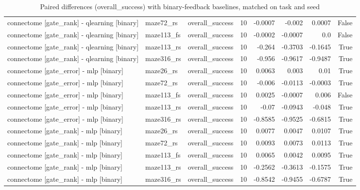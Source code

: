 \begin{table}[t]
\begin{tabular}{lllrrrrr}
connectome [gate\_rank] - qlearning [binary] & maze72\_rs & overall\_success & 10 & -0.0007 & -0.002 & 0.0007 & False \\
connectome [gate\_rank] - qlearning [binary] & maze113\_fs & overall\_success & 10 & -0.0002 & -0.0007 & 0.0 & False \\
connectome [gate\_rank] - qlearning [binary] & maze113\_rs & overall\_success & 10 & -0.264 & -0.3703 & -0.1645 & True \\
connectome [gate\_rank] - qlearning [binary] & maze316\_rs & overall\_success & 10 & -0.956 & -0.9617 & -0.9487 & True \\
connectome [gate\_error] - mlp [binary] & maze26\_rs & overall\_success & 10 & 0.0063 & 0.003 & 0.01 & True \\
connectome [gate\_error] - mlp [binary] & maze72\_rs & overall\_success & 10 & -0.006 & -0.0113 & -0.0003 & True \\
connectome [gate\_error] - mlp [binary] & maze113\_fs & overall\_success & 10 & 0.0025 & -0.0007 & 0.006 & False \\
connectome [gate\_error] - mlp [binary] & maze113\_rs & overall\_success & 10 & -0.07 & -0.0943 & -0.048 & True \\
connectome [gate\_error] - mlp [binary] & maze316\_rs & overall\_success & 10 & -0.8585 & -0.9525 & -0.6815 & True \\
connectome [gate\_rank] - mlp [binary] & maze26\_rs & overall\_success & 10 & 0.0077 & 0.0047 & 0.0107 & True \\
connectome [gate\_rank] - mlp [binary] & maze72\_rs & overall\_success & 10 & 0.0093 & 0.0073 & 0.0113 & True \\
connectome [gate\_rank] - mlp [binary] & maze113\_fs & overall\_success & 10 & 0.0065 & 0.0042 & 0.0095 & True \\
connectome [gate\_rank] - mlp [binary] & maze113\_rs & overall\_success & 10 & -0.2562 & -0.3613 & -0.1575 & True \\
connectome [gate\_rank] - mlp [binary] & maze316\_rs & overall\_success & 10 & -0.8542 & -0.9455 & -0.6787 & True \\
\bottomrule
\end{tabular}
\caption{Paired differences (overall\_success) with binary-feedback baselines, matched on task and seed}
\label{tab:gridworld_binary_paired_overall_success}
\end{table}